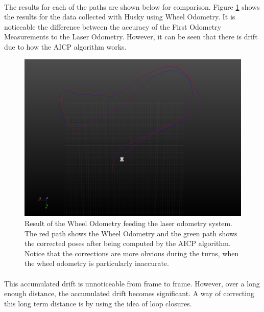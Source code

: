 \documentclass[12pt]{article}
\begin{document}
	\paragraph{}
	The results for each of the paths are shown below for comparison. Figure \ref{fig:LaserOdometry1} shows the results for the data collected with Husky using Wheel Odometry. It is noticeable the difference between the accuracy of the First Odometry Measurements to the Laser Odometry. However, it can be seen that there is drift due to how the AICP algorithm works.
	\begin{figure}
	\begin{minipage}{0.65\textwidth}
		\centering
		\includegraphics[width=\textwidth]{LaserOdometry1}
	\end{minipage} \hfill
	\begin{minipage}{0.35\textwidth}
		\centering
		\caption[t]{Result of the Wheel Odometry feeding the laser odometry system. The red path shows the Wheel Odometry and the green path shows the corrected poses after being computed by the AICP algorithm. Notice that the corrections are more obvious during the turns, when the wheel odometry is particularly inaccurate.}
		\label{fig:LaserOdometry1}	
	\end{minipage}				
	\end{figure}
	\paragraph{}
	This accumulated drift is unnoticeable from frame to frame. However, over a long enough distance, the accumulated drift becomes significant. A way of correcting this long term distance is by using the idea of loop closures.
	
\end{document}
